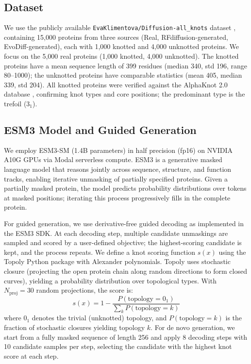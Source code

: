 \documentclass{article}
\begin{document}
\subsection{Dataset}

We use the publicly available \texttt{EvaKlimentova/Diffusion-all\_knots} dataset \cite{klimentova2024unveiling}, containing 15,000 proteins from three sources (Real, RFdiffusion-generated, EvoDiff-generated), each with 1,000 knotted and 4,000 unknotted proteins. We focus on the 5,000 real proteins (1,000 knotted, 4,000 unknotted). The knotted proteins have a mean sequence length of 399 residues (median 340, std 196, range 80--1000); the unknotted proteins have comparable statistics (mean 405, median 339, std 204). All knotted proteins were verified against the AlphaKnot 2.0 database \cite{alphaknot}, confirming knot types and core positions; the predominant type is the trefoil ($3_1$).

\subsection{ESM3 Model and Guided Generation}

We employ ESM3-SM (1.4B parameters) \cite{hayes2025simulating} in half precision (fp16) on NVIDIA A10G GPUs via Modal serverless compute. ESM3 is a generative masked language model that reasons jointly across sequence, structure, and function tracks, enabling iterative unmasking of partially specified proteins. Given a partially masked protein, the model predicts probability distributions over tokens at masked positions; iterating this process progressively fills in the complete protein.

For guided generation, we use derivative-free guided decoding \cite{dfg_diffusion} as implemented in the ESM3 SDK. At each decoding step, multiple candidate unmaskings are sampled and scored by a user-defined objective; the highest-scoring candidate is kept, and the process repeats. We define a knot scoring function $s(x)$ using the Topoly Python package \cite{topoly} with Alexander polynomials. Topoly uses stochastic closure (projecting the open protein chain along random directions to form closed curves), yielding a probability distribution over topological types. With $N_{\text{proj}}=30$ random projections, the score is:
\begin{equation}
s(x) = 1 - \frac{P(\text{topology} = 0_1)}{\sum_k P(\text{topology} = k)}
\end{equation}
where $0_1$ denotes the trivial (unknotted) topology, and $P(\text{topology}=k)$ is the fraction of stochastic closures yielding topology $k$. For de novo generation, we start from a fully masked sequence of length 256 and apply 8 decoding steps with 10 candidate samples per step, selecting the candidate with the highest knot score at each step.
\end{document}
